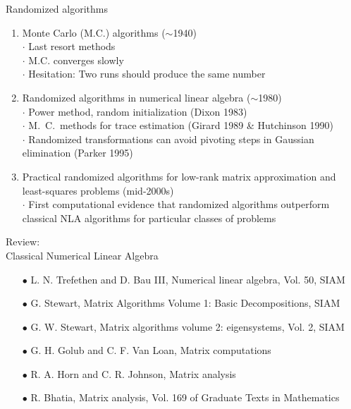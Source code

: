 \documentclass{beamer}
\begin{document}
\begin{frame}{Randomized algorithms}
\begin{enumerate}
    \item Monte Carlo (M.C.) algorithms ($\sim$1940)\\
    $\cdot$ Last resort methods\\
    $\cdot$ M.C. converges slowly\\
    $\cdot$ Hesitation: Two runs should produce the same number
    \item Randomized algorithms in numerical linear algebra ($\sim$1980)\\
    $\cdot$ Power method, random initialization (Dixon 1983)\\
    $\cdot$ M.~C.~methods for trace estimation (Girard 1989 \& Hutchinson 1990)\\
    $\cdot$ Randomized transformations can avoid pivoting
steps in Gaussian elimination (Parker 1995)\\
    \item  Practical randomized algorithms for low-rank matrix approximation and least-squares problems (mid-2000s)\\
    $\cdot$ First computational evidence that randomized algorithms outperform classical NLA algorithms for particular classes of problems
\end{enumerate}
\end{frame}


\begin{frame}{}
\vspace{2.5cm}
\begin{center}
\begin{Large}
    Review:\\
    Classical Numerical Linear Algebra
\end{Large}
\end{center}
\vspace{1.5cm} 
\begin{footnotesize}
\begin{itemize}
    \item[$\bullet$] L. N. Trefethen and D. Bau III, Numerical linear algebra, Vol. 50, SIAM
    \item[$\bullet$] G. Stewart, Matrix Algorithms Volume 1: Basic Decompositions, SIAM
    \item[$\bullet$] G. W. Stewart, Matrix algorithms volume 2: eigensystems, Vol. 2, SIAM
    \item[$\bullet$] G. H. Golub and C. F. Van Loan, Matrix computations
    \item[$\bullet$] R. A. Horn and C. R. Johnson, Matrix analysis
    \item[$\bullet$] R. Bhatia, Matrix analysis, Vol. 169 of Graduate Texts in Mathematics
\end{itemize}
\end{footnotesize}

\end{frame}
\end{document}
